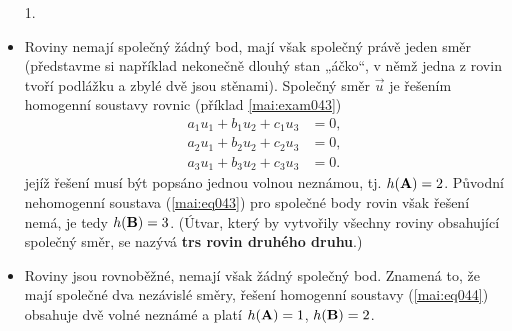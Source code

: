 \begin{mdframed}[style=mdexam]
\begin{example}
\begin{itemize}
            1\).
      \item Roviny nemají společný žádný bod, mají však společný právě jeden směr (představme si
            například nekonečně dlouhý stan „áčko“, v němž jedna z rovin tvoří podlážku a zbylé dvě
            jsou stěnami). Společný směr \(\vec{u}\) je řešením homogenní soustavy rovnic (příklad
            \ref{mai:exam043})
            \begin{subequations}\label{mai:eq044}
              \begin{align}
                a_1u_1 + b_1u_2+ c_1u_3 &= 0, \label{mai:eq044a} \\
                a_2u_1 + b_2u_2+ c_2u_3 &= 0, \label{mai:eq044b} \\
                a_3u_1 + b_3u_2+ c_3u_3 &= 0. \label{mai:eq044c}
              \end{align}
            \end{subequations}
            jejíž řešení musí být popsáno jednou volnou neznámou, tj. \(h(\mathbf{A}) = 2\). Původní
            nehomogenní soustava (\ref{mai:eq043}) pro společné body rovin však řešení nemá, je tedy
            \(h(\mathbf{B}) = 3\). (Útvar, který by vytvořily všechny roviny obsahující společný směr,
            se nazývá \textbf{trs rovin druhého druhu}.)
      \item Roviny jsou rovnoběžné, nemají však žádný společný bod. Znamená to, že mají společné dva
            nezávislé směry, řešení homogenní soustavy (\ref{mai:eq044}) obsahuje dvě volné neznámé
            a platí \(h(\mathbf{A}) = 1\), \(h(\mathbf{B}) = 2\).
    \end{itemize}
  \end{example}
\end{mdframed}